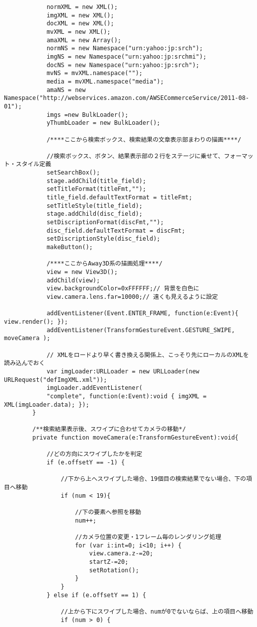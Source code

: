 {\begin{verbatim}
			normXML = new XML();
			imgXML = new XML();
			docXML = new XML();
			mvXML = new XML();
			amaXML = new Array();
			normNS = new Namespace("urn:yahoo:jp:srch");
			imgNS = new Namespace("urn:yahoo:jp:srchmi");
			docNS = new Namespace("urn:yahoo:jp:srch");
			mvNS = mvXML.namespace("");
			media = mvXML.namespace("media");
			amaNS = new Namespace("http://webservices.amazon.com/AWSECommerceService/2011-08-01");
			imgs =new BulkLoader();
			yThumbLoader = new BulkLoader();
			
			/****ここから検索ボックス、検索結果の文章表示部まわりの描画****/
			
			//検索ボックス、ボタン、結果表示部の２行をステージに乗せて、フォーマット・スタイル定義
			setSearchBox();
			stage.addChild(title_field);
			setTitleFormat(titleFmt,"");
			title_field.defaultTextFormat = titleFmt;
			setTitleStyle(title_field);
			stage.addChild(disc_field);
			setDiscriptionFormat(discFmt,"");
			disc_field.defaultTextFormat = discFmt;
			setDiscriptionStyle(disc_field);
			makeButton();
			
			/****ここからAway3D系の描画処理****/
			view = new View3D();
			addChild(view);
			view.backgroundColor=0xFFFFFF;// 背景を白色に
			view.camera.lens.far=10000;// 遠くも見えるように設定
			
			addEventListener(Event.ENTER_FRAME, function(e:Event){ view.render(); });
			addEventListener(TransformGestureEvent.GESTURE_SWIPE, moveCamera );
			
			// XMLをロードより早く書き換える関係上、こっそり先にローカルのXMLを読み込んでおく
			var imgLoader:URLLoader = new URLLoader(new URLRequest("defImgXML.xml"));
			imgLoader.addEventListener(
			"complete", function(e:Event):void { imgXML = XML(imgLoader.data); });
		}
		
		/**検索結果表示後、スワイプに合わせてカメラの移動*/
		private function moveCamera(e:TransformGestureEvent):void{
			
			//どの方向にスワイプしたかを判定
			if (e.offsetY == -1) {
				
				//下から上へスワイプした場合、19個目の検索結果でない場合、下の項目へ移動
				if (num < 19){
					
					//下の要素へ参照を移動
					num++;
					
					//カメラ位置の変更・1フレーム毎のレンダリング処理
					for (var i:int=0; i<10; i++) {
						view.camera.z-=20;
						startZ-=20;
						setRotation();
					}
				}
			} else if (e.offsetY == 1) {
				
				//上から下にスワイプした場合、numが0でないならば、上の項目へ移動
				if (num > 0) {
					

\end{verbatim}}
